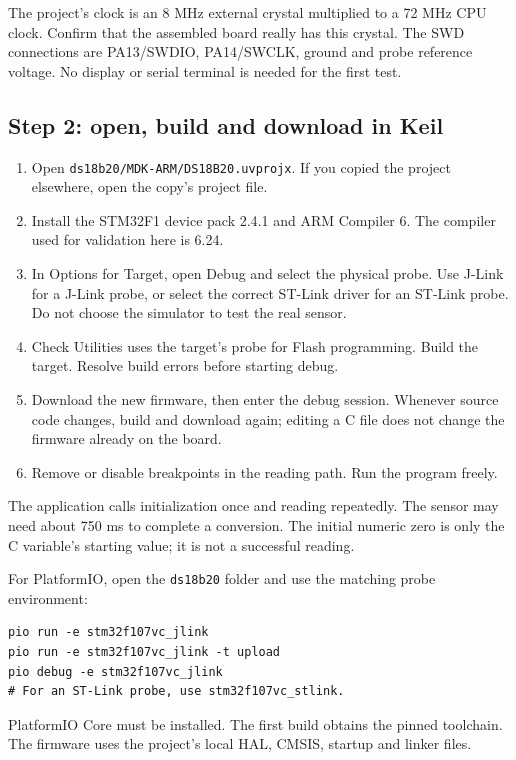 The project's clock is an 8 MHz external crystal multiplied to a 72 MHz CPU clock. Confirm that the assembled board really has this crystal. The SWD connections are PA13/SWDIO, PA14/SWCLK, ground and probe reference voltage. No display or serial terminal is needed for the first test.


\subsection{Step 2: open, build and download in Keil}
\begin{enumerate}
\item Open \texttt{ds18b20/MDK-ARM/DS18B20.uvprojx}. If you copied the project elsewhere, open the copy's project file.
\item Install the STM32F1 device pack 2.4.1 and ARM Compiler 6. The compiler used for validation here is 6.24.
\item In Options for Target, open Debug and select the physical probe. Use J-Link for a J-Link probe, or select the correct ST-Link driver for an ST-Link probe. Do not choose the simulator to test the real sensor.
\item Check Utilities uses the target's probe for Flash programming. Build the target. Resolve build errors before starting debug.
\item Download the new firmware, then enter the debug session. Whenever source code changes, build and download again; editing a C file does not change the firmware already on the board.
\item Remove or disable breakpoints in the reading path. Run the program freely.
\end{enumerate}
The application calls initialization once and reading repeatedly. The sensor may need about 750 ms to complete a conversion. The initial numeric zero is only the C variable's starting value; it is not a successful reading.

For PlatformIO, open the \texttt{ds18b20} folder and use the matching probe environment:
\begin{lstlisting}[language={},numbers=none]
pio run -e stm32f107vc_jlink
pio run -e stm32f107vc_jlink -t upload
pio debug -e stm32f107vc_jlink
# For an ST-Link probe, use stm32f107vc_stlink.
\end{lstlisting}
PlatformIO Core must be installed. The first build obtains the pinned toolchain. The firmware uses the project's local HAL, CMSIS, startup and linker files.

